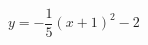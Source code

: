 \hspace*{2mm}\begin{minipage}[t]{\dimexpr\linewidth-2mm\relax}\vspace{0pt}
$y=-\dfrac{1}{5}(x+1)^2-2$\end{minipage}
